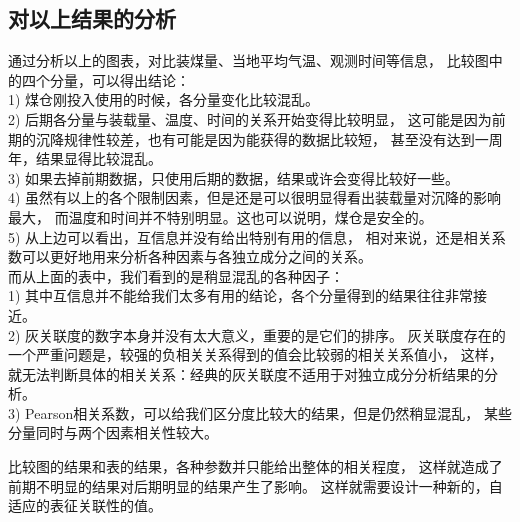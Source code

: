 
\clearpage

\subsection{对以上结果的分析}
通过分析以上的图表，对比装煤量、当地平均气温、观测时间等信息，
比较图中的四个分量，可以得出结论：\\
    1) 煤仓刚投入使用的时候，各分量变化比较混乱。\\
    2) 后期各分量与装载量、温度、时间的关系开始变得比较明显，
	这可能是因为前期的沉降规律性较差，也有可能是因为能获得的数据比较短，
	甚至没有达到一周年，结果显得比较混乱。\\
    3) 如果去掉前期数据，只使用后期的数据，结果或许会变得比较好一些。\\
    4) 虽然有以上的各个限制因素，但是还是可以很明显得看出装载量对沉降的影响最大，
	而温度和时间并不特别明显。这也可以说明，煤仓是安全的。\\
    5) 从上边可以看出，互信息并没有给出特别有用的信息，
	相对来说，还是相关系数可以更好地用来分析各种因素与各独立成分之间的关系。\\

而从上面的表中，我们看到的是稍显混乱的各种因子：\\
  1)  其中互信息并不能给我们太多有用的结论，各个分量得到的结果往往非常接近。\\
  2)  灰关联度的数字本身并没有太大意义，重要的是它们的排序。 
      灰关联度存在的一个严重问题是，较强的负相关关系得到的值会比较弱的相关关系值小，
      这样，就无法判断具体的相关关系：经典的灰关联度不适用于对独立成分分析结果的分析。\\
  3)  Pearson相关系数，可以给我们区分度比较大的结果，但是仍然稍显混乱，
      某些分量同时与两个因素相关性较大。

比较图的结果和表的结果，各种参数并只能给出整体的相关程度，
这样就造成了前期不明显的结果对后期明显的结果产生了影响。
这样就需要设计一种新的，自适应的表征关联性的值。


